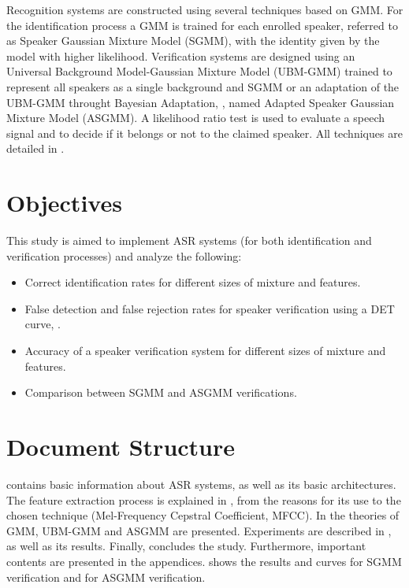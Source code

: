 Recognition systems are constructed using several techniques based on GMM. For the identification process a GMM is trained for each enrolled speaker, referred to as Speaker Gaussian Mixture Model (SGMM), with the identity given by the model with higher likelihood. Verification systems are designed using an Universal Background Model-Gaussian Mixture Model (UBM-GMM) trained to represent all speakers as a single background and SGMM or an adaptation of the UBM-GMM throught Bayesian Adaptation, , named Adapted Speaker Gaussian Mixture Model (ASGMM). A likelihood ratio test is used to evaluate a speech signal and to decide if it belongs or not to the claimed speaker. All techniques are detailed in .


\section{Objectives}

This study is aimed to implement ASR systems (for both identification and verification processes) and analyze the following:

\begin{itemize}\itemsep0pt
    \item Correct identification rates for different sizes of mixture and features.
    \item False detection and false rejection rates for speaker verification using a DET curve, .
    \item Accuracy of a speaker verification system for different sizes of mixture and features.
    \item Comparison between SGMM and ASGMM verifications.
\end{itemize}

\section{Document Structure}

 contains basic information about ASR systems, as well as its basic architectures. The feature extraction process is explained in , from the reasons for its use to the chosen technique (Mel-Frequency Cepstral Coefficient, MFCC). In  the theories of GMM, UBM-GMM and ASGMM are presented. Experiments are described in , as well as its results. Finally,  concludes the study. Furthermore, important contents are presented in the appendices.  shows the results and curves for SGMM verification and  for ASGMM verification.